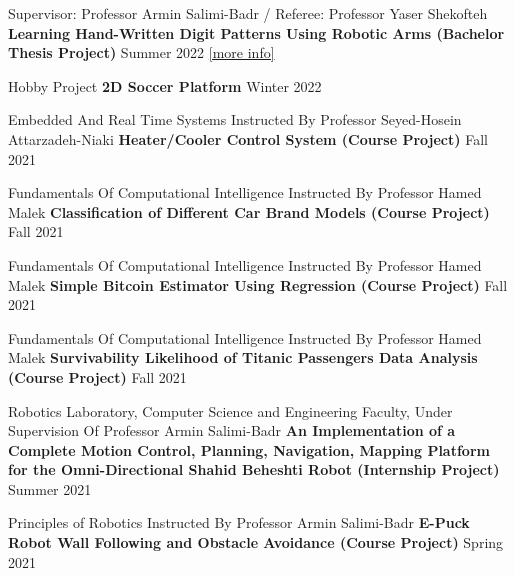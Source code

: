 
\begin{cventries}
    \cventry
    {Supervisor: Professor Armin Salimi-Badr / Referee: Professor Yaser Shekofteh}
    {\textbf {Learning Hand-Written Digit Patterns Using Robotic Arms (Bachelor Thesis Project)}}
    {}
    {Summer 2022}
    {\href{https://ph504.github.io/portfolio/portfolio-1/}{\textcolor{cobalt}{[more info]}}\newline}
    \vspace{0.35 cm}
    
    \cventry
    {Hobby Project}
    {\textbf {2D Soccer Platform}}
    {}
    {Winter 2022}
    {}
    \vspace{0.35 cm}
    
    \cventry
    {Embedded And Real Time Systems Instructed By Professor Seyed-Hosein Attarzadeh-Niaki}
    {\textbf {Heater/Cooler Control System (Course Project)}}
    {}
    {Fall 2021}
    {}
    \vspace{0.35 cm}
    
      \cventry
    {Fundamentals Of Computational Intelligence Instructed By Professor Hamed Malek}
    {\textbf {Classification of Different Car Brand Models (Course Project)}}
    {}
    {Fall 2021}
    {}
    \vspace{0.35 cm}
	
	    \cventry
    {Fundamentals Of Computational Intelligence Instructed By Professor Hamed Malek}
    {\textbf {Simple Bitcoin Estimator Using Regression (Course Project)}}
    {}
    {Fall 2021}
    {}
    \vspace{0.35 cm}

      \cventry
    {Fundamentals Of Computational Intelligence Instructed By Professor Hamed Malek}
    {\textbf {Survivability Likelihood of Titanic Passengers Data Analysis (Course Project)}}
    {}
    {Fall 2021}
    {}
    \vspace{0.35 cm}
    
     \cventry
    {Robotics Laboratory, Computer Science and Engineering Faculty, Under Supervision Of Professor Armin Salimi-Badr}
    {\textbf {An Implementation of a Complete Motion Control, Planning, Navigation, Mapping Platform for the Omni-Directional Shahid Beheshti Robot (Internship Project)}}
    {}
    {Summer 2021}
    {}
    \vspace{0.35 cm}
    
    \cventry
    {Principles of Robotics Instructed By Professor Armin Salimi-Badr}
    {\textbf {E-Puck Robot Wall Following and Obstacle Avoidance (Course Project)}}
    {}
    {Spring 2021}
    {}
    \vspace{0.35 cm}
        

\end{cventries}
